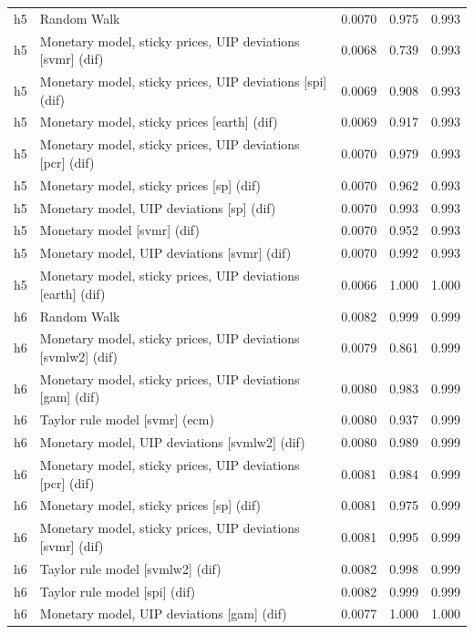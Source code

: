\begin{ThreePartTable}
\begin{longtable}[t]{cp{5.5cm}ccc}
h5 & \raggedright Random Walk & 0.0070 & 0.975 & 0.993\\
h5 & \raggedright Monetary model, sticky prices, UIP deviations [svmr] (dif) & 0.0068 & 0.739 & 0.993\\
h5 & \raggedright Monetary model, sticky prices, UIP deviations [spi] (dif) & 0.0069 & 0.908 & 0.993\\
h5 & \raggedright Monetary model, sticky prices [earth] (dif) & 0.0069 & 0.917 & 0.993\\
h5 & \raggedright Monetary model, sticky prices, UIP deviations [pcr] (dif) & 0.0070 & 0.979 & 0.993\\
h5 & \raggedright Monetary model, sticky prices [sp] (dif) & 0.0070 & 0.962 & 0.993\\
h5 & \raggedright Monetary model, UIP deviations [sp] (dif) & 0.0070 & 0.993 & 0.993\\
h5 & \raggedright Monetary model [svmr] (dif) & 0.0070 & 0.952 & 0.993\\
h5 & \raggedright Monetary model, UIP deviations [svmr] (dif) & 0.0070 & 0.992 & 0.993\\
h5 & \raggedright Monetary model, sticky prices, UIP deviations [earth] (dif) & 0.0066 & 1.000 & 1.000\\
\addlinespace
h6 & \raggedright Random Walk & 0.0082 & 0.999 & 0.999\\
h6 & \raggedright Monetary model, sticky prices, UIP deviations [svmlw2] (dif) & 0.0079 & 0.861 & 0.999\\
h6 & \raggedright Monetary model, sticky prices, UIP deviations [gam] (dif) & 0.0080 & 0.983 & 0.999\\
h6 & \raggedright Taylor rule model [svmr] (ecm) & 0.0080 & 0.937 & 0.999\\
h6 & \raggedright Monetary model, UIP deviations [svmlw2] (dif) & 0.0080 & 0.989 & 0.999\\
h6 & \raggedright Monetary model, sticky prices, UIP deviations [pcr] (dif) & 0.0081 & 0.984 & 0.999\\
h6 & \raggedright Monetary model, sticky prices [sp] (dif) & 0.0081 & 0.975 & 0.999\\
h6 & \raggedright Monetary model, sticky prices, UIP deviations [svmr] (dif) & 0.0081 & 0.995 & 0.999\\
h6 & \raggedright Taylor rule model [svmlw2] (dif) & 0.0082 & 0.998 & 0.999\\
h6 & \raggedright Taylor rule model [spi] (dif) & 0.0082 & 0.999 & 0.999\\
h6 & \raggedright Monetary model, UIP deviations [gam] (dif) & 0.0077 & 1.000 & 1.000\\

\end{longtable}
\end{ThreePartTable}
